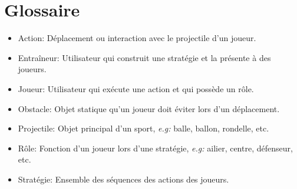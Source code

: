 %

\chapter{Glossaire}
\label{s:glossaire}

\begin{itemize}
    \item Action: Déplacement ou interaction avec le projectile d'un joueur.
        \\
    \item Entra\^ineur: Utilisateur qui construit une strat\'egie et la pr\'esente \`a des joueurs.
        \\
    \item Joueur: Utilisateur qui ex\'ecute une action et qui poss\`ede un r\^ole.
        \\
    \item Obstacle: Objet statique qu'un joueur doit \'eviter lors d'un d\'eplacement.
        \\
    \item Projectile: Objet principal d'un sport, \textit{e.g:} balle, ballon, rondelle, etc.
        \\
    \item R\^ole: Fonction d'un joueur lors d'une strat\'egie, \textit{e.g:} ailier, centre, d\'efenseur, etc.
        \\
    \item Stratégie: Ensemble des s\'equences des actions des joueurs.
        \\
\end{itemize}
